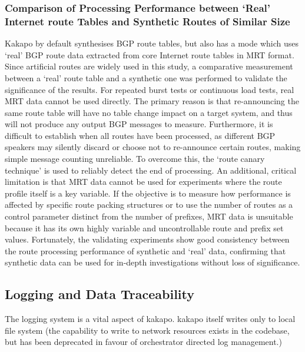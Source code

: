\subsubsection{Comparison of Processing Performance between `Real' Internet route Tables and Synthetic Routes of Similar Size}
Kakapo by default synthesises BGP route tables, but also has a mode which uses `real' BGP route data extracted from core Internet route tables in MRT format.
Since artificial routes are widely used in this study, a comparative measurement between a `real' route table and a synthetic one was performed to validate the significance of the results.
For repeated burst tests or continuous load tests, real MRT data cannot be used directly.
The primary reason is that re-announcing the same route table will have no table change impact on a target system, and thus will not produce any output BGP messages to measure.
Furthermore, it is difficult to establish when all routes have been processed, as different BGP speakers may silently discard or choose not to re-announce certain routes, making simple message counting unreliable.
To overcome this, the `route canary technique' is used to reliably detect the end of processing.
An additional, critical limitation is that MRT data cannot be used for experiments where the route profile itself is a key variable.
If the objective is to measure how performance is affected by specific route packing structures or to use the number of routes as a control parameter distinct from the number of prefixes, MRT data is unsuitable because it has its own highly variable and uncontrollable route and prefix set values.
Fortunately, the validating experiments show good consistency between the route processing performance of synthetic and `real' data, confirming that synthetic data can be used for in-depth investigations without loss of significance.

\subsection{Logging and Data Traceability}
The logging system is a vital aspect of kakapo.
kakapo itself writes only to local file system (the capability to write to network resources exists in the codebase, but has been deprecated in favour of orchestrator directed log management.)

